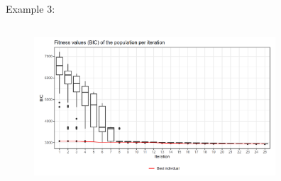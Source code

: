 \documentclass[11pt,compress,t,notes=noshow, xcolor=table]{beamer}
\begin{document}
\begin{vbframe}{Example 3:}








\vspace{0.5cm}
\begin{center}
\begin{figure}
  \includegraphics[height = 6cm, width = 9cm]{figure_man/var-selection1.png}
\end{figure}
\end{center}


\end{vbframe}
\end{document}

